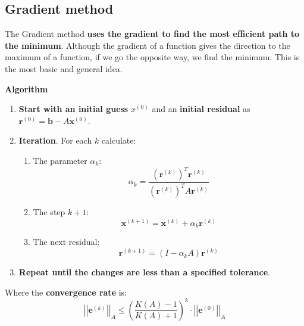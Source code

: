 \subsection{Gradient method}

The Gradient method \textbf{uses the gradient to find the most efficient path to the minimum}. Although the gradient of a function gives the direction to the maximum of a function, if we go the opposite way, we find the minimum. This is the most basic and general idea.

\begin{flushleft}
    \textcolor{Green3}{ \textbf{Algorithm}}
\end{flushleft}
\begin{enumerate}
    \item \textbf{Start with an initial guess} $x^{\left(0\right)}$ and an \textbf{initial residual} as $\mathbf{r}^{\left(0\right)} = \mathbf{b} - A\mathbf{x}^{\left(0\right)}$.
    \item \textbf{Iteration}. For each $k$ calculate:
    \begin{enumerate}
        \item The parameter $\alpha_{k}$:
        \begin{equation}
            \alpha_{k} = \dfrac{
                \left(\mathbf{r}^{\left(k\right)}\right)^{T}\mathbf{r}^{\left(k\right)}
            }{
                \left(\mathbf{r}^{\left(k\right)}\right)^{T}A\mathbf{r}^{\left(k\right)}
            }
        \end{equation}

        \item The step $k+1$:
        \begin{equation}
            \mathbf{x}^{\left(k+1\right)} = \mathbf{x}^{\left(k\right)} + \alpha_{k}\mathbf{r}^{\left(k\right)}
        \end{equation}

        \item The next residual:
        \begin{equation}
            \mathbf{r}^{\left(k+1\right)} = \left(I-\alpha_{k}A\right)\mathbf{r}^{\left(k\right)}
        \end{equation}
    \end{enumerate}
    \item \textbf{Repeat until the changes are less than a specified tolerance}.
\end{enumerate}
Where the \textbf{convergence rate} is:
\begin{equation}
    {\left|\left|\mathbf{e}^{\left(k\right)}\right|\right|}_{A} \le \left(\dfrac{K\left(A\right)-1}{K\left(A\right)+1}\right)^{k} \cdot {\left|\left|\mathbf{e}^{\left(0\right)}\right|\right|}_{A}
\end{equation}

